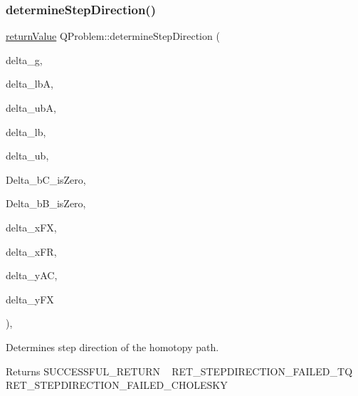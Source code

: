 \subsubsection{\texorpdfstring{determine\+Step\+Direction()}{determineStepDirection()}}
{\footnotesize\ttfamily \hyperlink{_message_handling_8hpp_a81d556f613bfbabd0b1f9488c0fa865e}{return\+Value} Q\+Problem\+::determine\+Step\+Direction (\begin{DoxyParamCaption}\item[{const \hyperlink{qp_o_a_s_e_s__wrapper_8h_a0d00e2b3dfadee81331bbb39068570c4}{real\+\_\+t} $\ast$const}]{delta\+\_\+g,  }\item[{const \hyperlink{qp_o_a_s_e_s__wrapper_8h_a0d00e2b3dfadee81331bbb39068570c4}{real\+\_\+t} $\ast$const}]{delta\+\_\+lbA,  }\item[{const \hyperlink{qp_o_a_s_e_s__wrapper_8h_a0d00e2b3dfadee81331bbb39068570c4}{real\+\_\+t} $\ast$const}]{delta\+\_\+ubA,  }\item[{const \hyperlink{qp_o_a_s_e_s__wrapper_8h_a0d00e2b3dfadee81331bbb39068570c4}{real\+\_\+t} $\ast$const}]{delta\+\_\+lb,  }\item[{const \hyperlink{qp_o_a_s_e_s__wrapper_8h_a0d00e2b3dfadee81331bbb39068570c4}{real\+\_\+t} $\ast$const}]{delta\+\_\+ub,  }\item[{\hyperlink{_types_8hpp_a20f82124c82b6f5686a7fce454ef9089}{Boolean\+Type}}]{Delta\+\_\+b\+C\+\_\+is\+Zero,  }\item[{\hyperlink{_types_8hpp_a20f82124c82b6f5686a7fce454ef9089}{Boolean\+Type}}]{Delta\+\_\+b\+B\+\_\+is\+Zero,  }\item[{\hyperlink{qp_o_a_s_e_s__wrapper_8h_a0d00e2b3dfadee81331bbb39068570c4}{real\+\_\+t} $\ast$const}]{delta\+\_\+x\+FX,  }\item[{\hyperlink{qp_o_a_s_e_s__wrapper_8h_a0d00e2b3dfadee81331bbb39068570c4}{real\+\_\+t} $\ast$const}]{delta\+\_\+x\+FR,  }\item[{\hyperlink{qp_o_a_s_e_s__wrapper_8h_a0d00e2b3dfadee81331bbb39068570c4}{real\+\_\+t} $\ast$const}]{delta\+\_\+y\+AC,  }\item[{\hyperlink{qp_o_a_s_e_s__wrapper_8h_a0d00e2b3dfadee81331bbb39068570c4}{real\+\_\+t} $\ast$const}]{delta\+\_\+y\+FX }\end{DoxyParamCaption})\hspace{0.3cm}{\ttfamily [protected]}, {\ttfamily [virtual]}}

Determines step direction of the homotopy path. \begin{DoxyReturn}{Returns}
S\+U\+C\+C\+E\+S\+S\+F\+U\+L\+\_\+\+R\+E\+T\+U\+RN ~\newline
 R\+E\+T\+\_\+\+S\+T\+E\+P\+D\+I\+R\+E\+C\+T\+I\+O\+N\+\_\+\+F\+A\+I\+L\+E\+D\+\_\+\+TQ ~\newline
 R\+E\+T\+\_\+\+S\+T\+E\+P\+D\+I\+R\+E\+C\+T\+I\+O\+N\+\_\+\+F\+A\+I\+L\+E\+D\+\_\+\+C\+H\+O\+L\+E\+S\+KY 
\end{DoxyReturn}

